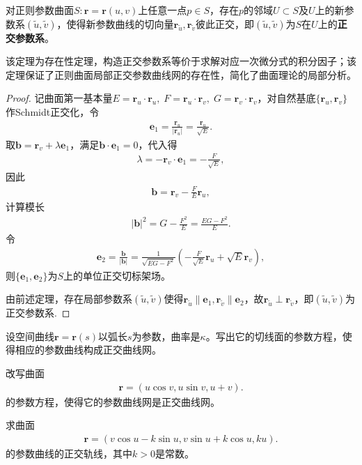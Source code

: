 \documentclass[../../main.tex]{subfiles}%
\begin{document}
\begin{theorem}
对正则参数曲面$S:\bm r=\bm r(u,v)$上任意一点$p\in S$，存在$p$的邻域$U\subset S$及$U$上的新参数系$(\tilde u,\tilde v)$，使得新参数曲线的切向量$\bm r_{\tilde u},\bm r_{\tilde v}$彼此正交，即$(\tilde u,\tilde v)$为$S$在$U$上的\textbf{正交参数系}。
\end{theorem}

\begin{remark}
该定理为存在性定理，构造正交参数系等价于求解对应一次微分式的积分因子；该定理保证了正则曲面局部正交参数曲线网的存在性，简化了曲面理论的局部分析。
\end{remark}

\begin{proof}

记曲面第一基本量$E=\bm r_u\cdot\bm r_u,\;F=\bm r_u\cdot\bm r_v,\;G=\bm r_v\cdot\bm r_v$，对自然基底$\{\bm r_u,\bm r_v\}$作Schmidt正交化，令
\begin{align}
\bm e_1=\frac{\bm r_u}{|\bm r_u|}=\frac{\bm r_u}{\sqrt{E}}.
\label{eq:orthobase1}
\end{align}
取$\bm b=\bm r_v+\lambda\bm e_1$，满足$\bm b\cdot\bm e_1=0$，代入得
\begin{align*}
\lambda = -\bm r_v\cdot\bm e_1 = -\frac{F}{\sqrt{E}},
\end{align*}
因此
\begin{align*}
\bm b=\bm r_v-\frac{F}{E}\bm r_u,
\end{align*}
计算模长
\begin{align*}
|\bm b|^2=G-\frac{F^2}{E}=\frac{EG-F^2}{E}.
\end{align*}
令
\begin{align}
\bm e_2=\frac{\bm b}{|\bm b|}=\frac{1}{\sqrt{EG-F^2}}\left(-\frac{F}{\sqrt{E}}\bm r_u+\sqrt{E}\bm r_v\right),
\label{eq:orthobase2}
\end{align}
则$\{\bm e_1,\bm e_2\}$为$S$上的单位正交切标架场。

由前述定理，存在局部参数系$(\tilde u,\tilde v)$使得$\bm r_{\tilde u}\parallel\bm e_1,\bm r_{\tilde v}\parallel\bm e_2$，故$\bm r_{\tilde u}\perp\bm r_{\tilde v}$，即$(\tilde u,\tilde v)$为正交参数系.

\end{proof}

\begin{example}
设空间曲线$\bm{r}=\bm{r}(s)$以弧长$s$为参数，曲率是$\kappa$。写出它的切线面的参数方程，使得相应的参数曲线构成正交曲线网。
\end{example}

\begin{example}
改写曲面
\begin{align*}
\bm{r}=(u\cos v,u\sin v,u+v).
\end{align*}
的参数方程，使得它的参数曲线网是正交曲线网。
\end{example}

\begin{example}
求曲面
\begin{align*}
\bm{r}=(v\cos u - k\sin u,v\sin u + k\cos u,ku).
\end{align*}
的参数曲线的正交轨线，其中$k>0$是常数。
\end{example}
\end{document}
